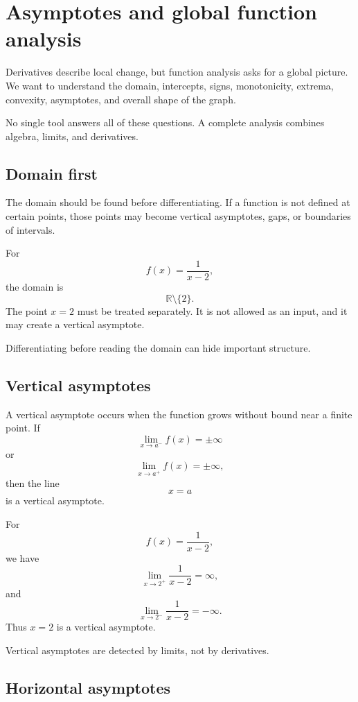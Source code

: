 \section{Asymptotes and global function analysis}

Derivatives describe local change, but function analysis asks for a global picture. We want to understand the domain, intercepts, signs, monotonicity, extrema, convexity, asymptotes, and overall shape of the graph.

No single tool answers all of these questions. A complete analysis combines algebra, limits, and derivatives.

\subsection*{Domain first}

The domain should be found before differentiating. If a function is not defined at certain points, those points may become vertical asymptotes, gaps, or boundaries of intervals.

\begin{examplebox}
For
\[
f(x)=\frac{1}{x-2},
\]
the domain is
\[
\mathbb{R}\setminus\{2\}.
\]
The point \(x=2\) must be treated separately. It is not allowed as an input, and it may create a vertical asymptote.
\end{examplebox}

Differentiating before reading the domain can hide important structure.

\subsection*{Vertical asymptotes}

A vertical asymptote occurs when the function grows without bound near a finite point. If
\[
\lim_{x\to a^-}f(x)=\pm\infty
\]
or
\[
\lim_{x\to a^+}f(x)=\pm\infty,
\]
then the line
\[
x=a
\]
is a vertical asymptote.

\begin{examplebox}
For
\[
f(x)=\frac{1}{x-2},
\]
we have
\[
\lim_{x\to2^+}\frac{1}{x-2}=\infty,
\]
and
\[
\lim_{x\to2^-}\frac{1}{x-2}=-\infty.
\]
Thus \(x=2\) is a vertical asymptote.
\end{examplebox}

Vertical asymptotes are detected by limits, not by derivatives.

\subsection*{Horizontal asymptotes}

